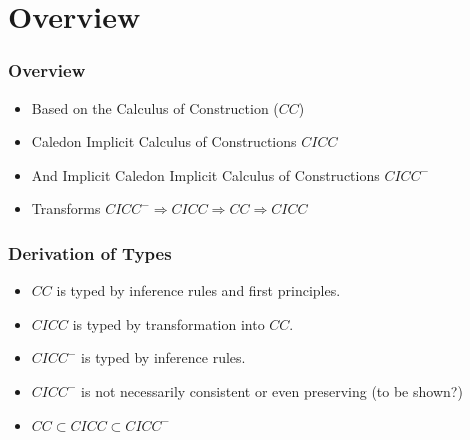 \section{Overview}

\begin{frame}
\frametitle{Overview}
\begin{itemize}
\item Based on the Calculus of Construction ($CC$)
\item Caledon Implicit Calculus of Constructions $CICC$
\item And Implicit Caledon Implicit Calculus of Constructions $CICC^-$
\item Transforms $CICC^- \Rightarrow CICC \Rightarrow CC \Rightarrow CICC$ 
\end{itemize}
\end{frame}
\begin{frame}
\frametitle{Derivation of Types}
\begin{itemize}
\item $CC$ is typed by inference rules and first principles.
\item $CICC$ is typed by transformation into $CC$.
\item $CICC^-$ is typed by inference rules.
\item $CICC^-$ is not necessarily consistent or even preserving (to be shown?)
\item $CC \subset CICC \subset CICC^-$
\end{itemize}
\end{frame}
